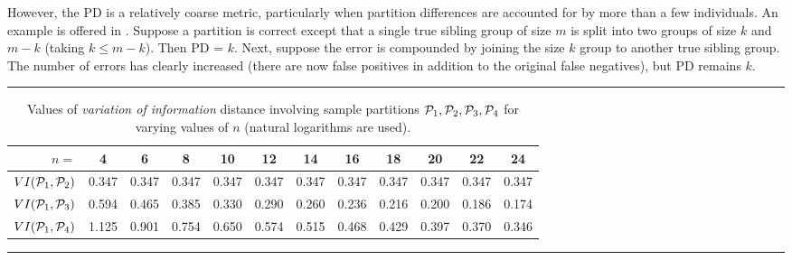 \documentclass[twoside,10pt,twocolumn]{article}
\newcommand{\calp}{{\cal P}}
\begin{document}
However, the PD is a relatively coarse metric, particularly when partition differences are accounted for by 
more than a few individuals. An example is offered in \citet{BrownDexter2012}. Suppose a partition is 
correct except that a single true sibling group of size $m$ is split into two groups of size $k$ and $m-k$ 
(taking $k \leq m-k$). Then PD = $k$. Next, suppose the error is compounded by joining the size $k$ group  
to another true sibling group. The number of errors has clearly increased (there are now false positives in 
addition to the original false negatives), but PD remains $k$. 

\begin{table}
\caption{Values of \emph{variation of information} distance involving sample partitions $\calp_1, \calp_2, 
\calp_3, \calp_4$ for varying values of $n$ (natural logarithms are used).}\label{vi.table}
\rule{\textwidth}{0.90pt}
\begin{center}
\begin{tabular}{r|ccccccccccc}
\multicolumn{1}{r}{$n=$} &   4  & 6  & 8  & 10  & 12  & 14  & 16  & 18  & 20  & 22  & 24 \\ \hline
$VI(\calp_1, \calp_2)$ & 0.347  &  0.347  & 0.347  &  0.347  & 0.347   & 0.347   & 0.347   & 0.347   & 0.347   & 0.347   & 0.347 \\
$VI(\calp_1, \calp_3)$ & 0.594  & 0.465  & 0.385   & 0.330   & 0.290   & 0.260   & 0.236   & 0.216   & 0.200   & 0.186   & 0.174 \\
$VI(\calp_1, \calp_4)$ & 1.125  & 0.901  & 0.754   & 0.650   & 0.574   & 0.515   & 0.468   & 0.429   & 0.397   & 0.370   & 0.346
\end{tabular}
\end{center}
\rule{\textwidth}{0.90pt}
\end{table}
\end{document}
